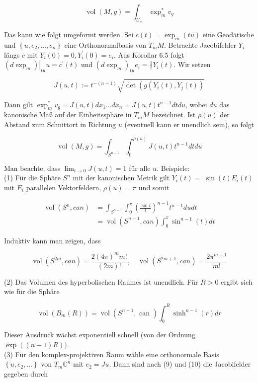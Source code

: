 \documentclass[10pt, letterpaper]{article}
\begin{document}
$$
\operatorname{vol}(M, g)=\int_{U_{m}} \exp _{m}^{*} v_{g}
$$

Das kann wie folgt umgeformt werden. Sei $c(t)=\exp _{m}(t u)$ eine Geodätische und $\left\{u, e_{2}, \ldots, e_{n}\right\}$ eine Orthonormalbasis von $T_{m} M$. Betrachte Jacobifelder $Y_{i}$ längs $c$ mit $Y_{i}(0)=0, Y_{i}^{\prime}(0)=e_{i}$. Aus Korollar 6.5 folgt $\left.\left(d \exp _{m}\right)\right|_{t u} u=c^{\prime}(t)$ und $\left(d \exp _{m}\right)_{t u} e_{i}=\frac{1}{t} Y_{i}(t)$. Wir setzen

$$
J(u, t):=t^{-(n-1)} \sqrt{\operatorname{det}\left(g\left(Y_{i}(t), Y_{j}(t)\right)\right.}
$$

Dann gilt $\exp _{m}^{*} v_{g}=J(u, t) d x_{1} \ldots d x_{n}=J(u, t) t^{n-1} d t d u$, wobei $d u$ das kanonische Maß auf der Einheitssphäre in $T_{m} M$ bezeichnet. Ist $\rho(u)$ der Abstand zum Schnittort in Richtung $u$ (eventuell kann er unendlich sein), so folgt


\begin{equation*}
\operatorname{vol}(M, g)=\int_{S^{n-1}} \int_{0}^{\rho(u)} J(u, t) t^{n-1} d t d u \tag{11}
\end{equation*}


Man beachte, dass $\lim _{t \rightarrow 0} J(u, t)=1$ für alle $u$. Beispiele:\\
(1) Für die Sphäre $S^{n}$ mit der kanonischen Metrik gilt $Y_{i}(t)=$ $\sin (t) E_{i}(t)$ mit $E_{i}$ parallelen Vektorfeldern, $\rho(u)=\pi$ und somit

$$
\begin{aligned}
\operatorname{vol}\left(S^{n}, c a n\right) & =\int_{S^{n-1}} \int_{0}^{\pi}\left(\frac{\sin t}{t}\right)^{n-1} t^{n-1} d u d t \\
& =\operatorname{vol}\left(S^{n-1}, c a n\right) \int_{0}^{\pi} \sin ^{n-1}(t) d t
\end{aligned}
$$

Induktiv kann man zeigen, dass

$$
\operatorname{vol}\left(S^{2 m}, c a n\right)=\frac{2(4 \pi)^{m} m!}{(2 m)!}, \quad \operatorname{vol}\left(S^{2 m+1}, c a n\right)=\frac{2 \pi^{m+1}}{m!}
$$

(2) Das Volumen des hyperbolischen Raumes ist unendlich. Für $R>0$ ergibt sich wie für die Sphäre

$$
\operatorname{vol}\left(B_{m}(R)\right)=\operatorname{vol}\left(S^{n-1}, \text { can }\right) \int_{0}^{R} \sinh ^{n-1}(r) d r
$$

Dieser Ausdruck wächst exponentiell schnell (von der Ordnung $\exp ((n-1) R))$.\\
(3) Für den komplex-projektiven Raum wähle eine orthonormale Basis $\left\{u, e_{2}, \ldots\right\}$ von $T_{m} \mathbb{C}^{n}$ mit $e_{2}=J u$. Dann sind nach (9) und (10) die Jacobifelder gegeben durch
\end{document}
